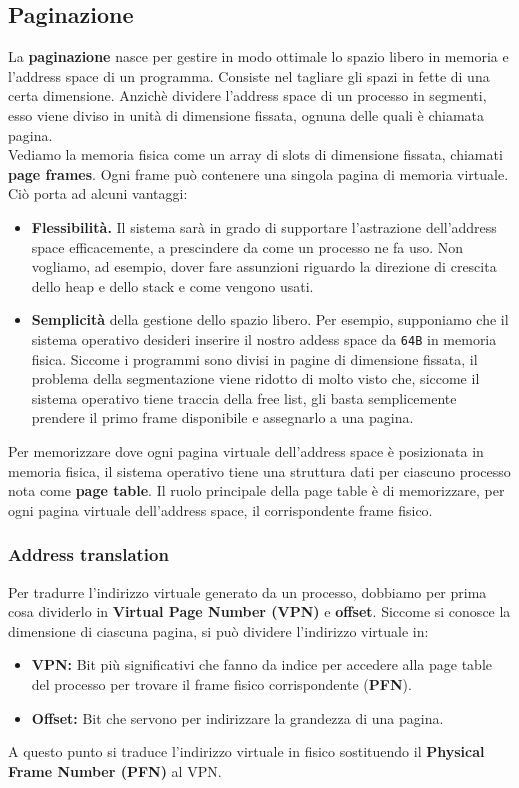 \documentclass[12pt, letterpaper]{article}
\begin{document}
		\subsection{Paginazione}
			La \textbf{paginazione} nasce per gestire in modo ottimale lo spazio libero in memoria e l'address space di un programma.
			Consiste nel tagliare gli spazi in fette di una certa dimensione. Anzichè dividere l'address space di un processo in segmenti, esso viene diviso in unità di dimensione fissata, ognuna delle quali è chiamata pagina.\\
			Vediamo la memoria fisica come un array di slots di dimensione fissata, chiamati \textbf{page frames}. Ogni frame può contenere una singola pagina di memoria virtuale. Ciò porta ad alcuni vantaggi: 
			\begin{itemize}
				\item \textbf{Flessibilità.} Il sistema sarà in grado di supportare l'astrazione dell'address space efficacemente, a prescindere da come un processo ne fa uso. Non vogliamo, ad esempio, dover fare assunzioni riguardo la direzione di crescita dello heap e dello stack e come vengono usati.
				\item \textbf{Semplicità} della gestione dello spazio libero. Per esempio, supponiamo che il sistema operativo desideri  inserire il nostro addess space da \texttt{64B} in memoria fisica. Siccome i programmi sono divisi in pagine di dimensione fissata, il problema della segmentazione viene ridotto di molto visto che, siccome il sistema operativo tiene traccia della free list, gli basta semplicemente prendere il primo frame disponibile e assegnarlo a una pagina.
			\end{itemize}
			Per memorizzare dove ogni pagina virtuale dell'address space è posizionata in memoria fisica, il sistema operativo tiene una struttura dati per  ciascuno processo nota come \textbf{page table}. Il ruolo principale della page table è di memorizzare, per ogni pagina virtuale dell'address space, il corrispondente frame fisico.	
			
			\subsubsection{Address translation}
				Per tradurre l'indirizzo virtuale generato da un processo, dobbiamo per prima cosa dividerlo in \textbf{Virtual Page Number (VPN)} e \textbf{offset}.
				Siccome si conosce la dimensione di ciascuna pagina, si può dividere l'indirizzo virtuale in:
				\begin{itemize}
					\item \textbf{VPN:} Bit più significativi che fanno da indice per accedere alla page table del processo per trovare il frame fisico corrispondente (\textbf{PFN}).
					\item \textbf{Offset:} Bit che servono per indirizzare la grandezza di una pagina.
				\end{itemize}
				A questo punto si traduce l'indirizzo virtuale in fisico sostituendo il \textbf{Physical Frame Number (PFN)} al VPN.
			
\end{document}
